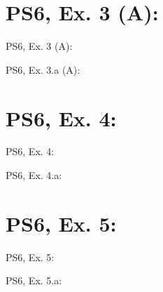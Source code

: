 \section{PS6, Ex. 3 (A): }

\begin{frame}{PS6, Ex. 3 (A): }
  \begin{multicols}{2}
    \vfill\null \columnbreak
    \vfill\null
  \end{multicols}
\end{frame}

\begin{frame}{PS6, Ex. 3.a (A): }
  \begin{multicols}{2}
    \vfill\null \columnbreak
    \vfill\null
  \end{multicols}
\end{frame}



\section{PS6, Ex. 4: }

\begin{frame}{PS6, Ex. 4: }
  \begin{multicols}{2}
    \vfill\null \columnbreak
    \vfill\null
  \end{multicols}
\end{frame}

\begin{frame}{PS6, Ex. 4.a: }
  \begin{multicols}{2}
    \vfill\null \columnbreak
    \vfill\null
  \end{multicols}
\end{frame}



\section{PS6, Ex. 5: }

\begin{frame}{PS6, Ex. 5: }
  \begin{multicols}{2}
    \vfill\null \columnbreak
    \vfill\null
  \end{multicols}
\end{frame}

\begin{frame}{PS6, Ex. 5.a: }
  \begin{multicols}{2}
    \vfill\null \columnbreak
    \vfill\null
  \end{multicols}
\end{frame}



